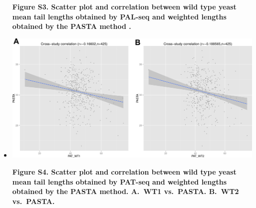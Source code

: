 \documentclass[10pt]{article}
\begin{document}
\begin{itemize}
{\textbf{Figure S3. Scatter plot and correlation between wild type yeast mean tail lengths obtained by PAL-seq \cite{subtelny14} and weighted lengths obtained by the PASTA method \cite{beilharz07}. }
}
\newpage

\item[]{
\begin{center}
\includegraphics[scale=0.9]{FigureS4.png}
\end{center}

\textbf{Figure S4. Scatter plot and correlation between wild type yeast mean tail lengths obtained by PAT-seq and weighted lengths obtained by the PASTA method. \textbf{A.}~WT1 vs.\ PASTA. \textbf{B.}~WT2 vs.\ PASTA. }
}

\end{itemize}
\end{document}
